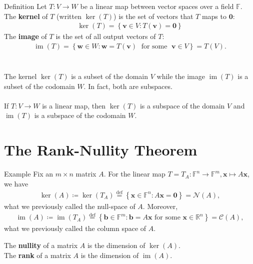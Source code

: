 \documentclass{report}
\renewcommand{\vec}{\mathbf}
\newcommand{\Ker}{\operatorname{ker}}
\newcommand{\Image}{\operatorname{im}}
\begin{document}
\begin{enumerate}
		\begin{question}{Definition}
			Let $T: V \to W$ be a linear map between vector spaces over a field $\mathbb{F}$. The \textbf{kernel} of $T$ (written $\operatorname{ker}(T)$) is the set of vectors that $T$ maps to $\vec{0}$:
			\begin{align*}
				\Ker(T) = \left\{\vec{v} \in V: T(\vec{v}) = \vec{0} \right\}
			\end{align*}
			The \textbf{image} of $T$ is the set of all output vectors of $T$:
			\begin{align*}
				\Image(T) = \left\{ \vec{w} \in W: \vec{w} = T(\vec{v}) \; \text{ for some } \; \vec{v} \in V \right\} = T(V).
			\end{align*}
			\\ \\
			The kernel $\Ker(T)$ is a subset of the domain $V$ while the image $\Image(T)$ is a subset of the codomain $W$. In fact, both are subspaces.
			\\ \\
			If $T: V \to W$ is a linear map, then $\Ker(T)$ is a subspace of the domain $V$ and $\Image(T)$ is a subspace of the codomain $W$.
		\end{question}

\chapter{The Rank-Nullity Theorem}

	\begin{question}{Example}
		Fix an $m \times n$ matrix $A$. For the linear map $T = T_A: \mathbb{F}^n \to \mathbb{F}^m, \vec{x} \mapsto A \vec{x}$, we have
		\begin{align*}
			\Ker(A) \coloneq \Ker(T_A) \overset{\text{def}}{=} \left\{ \vec{x} \in \mathbb{F}^n: A\vec{x} = \vec{0} \right\} = \mathcal{N}(A),
		\end{align*}
		what we previously called the null-space of $A$. Moreover,
		\begin{align*}
			\Image(A) \coloneq \Image(T_A) \overset{\text{def}}{=} \left\{ \vec{b} \in \mathbb{F}^m: \vec{b} = A\vec{x} \text{ for some } \vec{x} \in \mathbb{R}^n \right\} = \mathcal{C}(A),
		\end{align*}
		what we previously called the column space of $A$.
	\end{question}

	The \textbf{nullity} of a matrix $A$ is the dimension of $\Ker(A)$.
	\\
	The \textbf{rank} of a matrix $A$ is the dimension of $\Image(A)$.


\end{enumerate}
\end{document}
